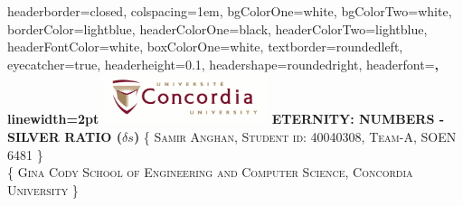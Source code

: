 \documentclass[landscape,a0paper,fontscale=0.285]{baposter} %
\begin{document}
\begin{poster}
{
headerborder=closed, %
colspacing=1em, %
bgColorOne=white, %
bgColorTwo=white, %
borderColor=lightblue, %
headerColorOne=black, %
headerColorTwo=lightblue, %
headerFontColor=white, %
boxColorOne=white, %
textborder=roundedleft, %
eyecatcher=true, %
headerheight=0.1\textheight, %
headershape=roundedright, %
headerfont=\Large\bf\textsc, %
linewidth=2pt %
}
%
{\includegraphics[height=4em]{logo.jpg}} %
{\bf\textsc{ETERNITY: NUMBERS - SILVER RATIO ($\delta s$)}} %
{\textsc{\{ Samir Anghan, Student id: 40040308, Team-A, SOEN 6481 \} 
\\ \{ Gina Cody School of Engineering and Computer Science, Concordia University \} }} %



\end{poster}
\end{document}
